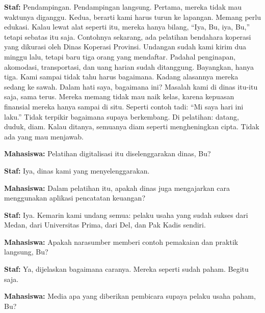 {\noindent \textbf{Staf:} Pendampingan. Pendampingan langsung. Pertama, mereka tidak mau waktunya diganggu. Kedua, berarti kami harus turun ke lapangan. Memang perlu edukasi. Kalau lewat alat seperti itu, mereka hanya bilang, ``Iya, Bu, iya, Bu,'' tetapi sebatas itu saja. Contohnya sekarang, ada pelatihan bendahara koperasi yang dikurasi oleh Dinas Koperasi Provinsi. Undangan sudah kami kirim dua minggu lalu, tetapi baru tiga orang yang mendaftar. Padahal penginapan, akomodasi, transportasi, dan uang harian sudah ditanggung. Bayangkan, hanya tiga. Kami sampai tidak tahu harus bagaimana. Kadang alasannya mereka sedang ke sawah. Dalam hati saya, bagaimana ini? Masalah kami di dinas itu-itu saja, sama terus. Mereka memang tidak mau naik kelas, karena kepuasan finansial mereka hanya sampai di situ. Seperti contoh tadi: ``Mi saya hari ini laku.'' Tidak terpikir bagaimana supaya berkembang. Di pelatihan: datang, duduk, diam. Kalau ditanya, semuanya diam seperti mengheningkan cipta. Tidak ada yang mau menjawab.

\noindent \textbf{Mahasiswa:} Pelatihan digitalisasi itu diselenggarakan dinas, Bu?

\noindent \textbf{Staf:} Iya, dinas kami yang menyelenggarakan.

\noindent \textbf{Mahasiswa:} Dalam pelatihan itu, apakah dinas juga mengajarkan cara menggunakan aplikasi pencatatan keuangan?

\noindent \textbf{Staf:} Iya. Kemarin kami undang semua: pelaku usaha yang sudah sukses dari Medan, dari Universitas Prima, dari Del, dan Pak Kadis sendiri.

\noindent \textbf{Mahasiswa:} Apakah narasumber memberi contoh pemakaian dan praktik langsung, Bu?

\noindent \textbf{Staf:} Ya, dijelaskan bagaimana caranya. Mereka seperti sudah paham. Begitu saja.

\noindent \textbf{Mahasiswa:} Media apa yang diberikan pembicara supaya pelaku usaha paham, Bu?

}
